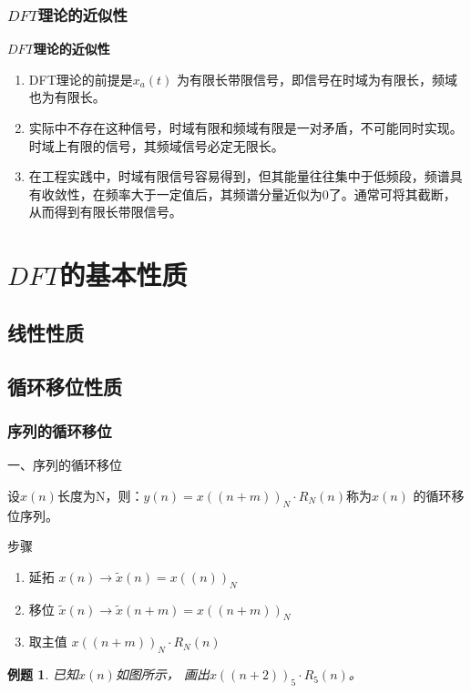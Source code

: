 \documentclass[notheorems,compress,mathserif,table]{beamer}
\newtheorem{example}{例题}
\begin{document}
\begin{frame}[shrink]\frametitle{$DFT$理论的近似性}%
\textbf{$DFT$理论的近似性}
\begin{enumerate}
  \item DFT理论的前提是$x_a(t)$ 为有限长带限信号，即信号在时域为有限长，频域也为有限长。
  \item 实际中不存在这种信号，时域有限和频域有限是一对矛盾，不可能同时实现。时域上有限的信号，其频域信号必定无限长。
  \item 在工程实践中，时域有限信号容易得到，但其能量往往集中于低频段，频谱具有收敛性，在频率大于一定值后，其频谱分量近似为0了。通常可将其截断，从而得到有限长带限信号。
\end{enumerate}
\end{frame}

\section{$DFT$的基本性质}

\subsection{线性性质}

%


\subsection{循环移位性质}
\begin{frame}[shrink]\frametitle{序列的循环移位}%
一、序列的循环移位

设$x(n)$长度为N，则：$y(n) = x((n+m))_N\cdot R_N(n)$称为$x(n)$ 的循环移位序列。


步骤
\begin{enumerate}
  \item 延拓 \quad \quad\quad \quad     $x(n)\longrightarrow \tilde{x}(n) = x((n))_N$
  \item 移位 \quad \quad \quad \quad    $\tilde{x}(n)\longrightarrow \tilde{x}(n+m) = x((n+m))_N$
  \item 取主值  \quad \quad \quad       $x((n+m))_N\cdot R_N(n)$
\end{enumerate}

\begin{example}
已知$x(n)$如图所示，
画出$x((n+2))_5 \cdot R_5(n)$。
\end{example}
\quad\newline\newline\newline\newline\quad
\end{frame}
\end{document}
